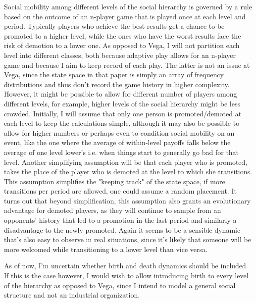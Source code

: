 \documentclass[11pt, a4paper, leqno]{article}
\begin{document}
Social mobility among different levels of the social hierarchy is governed by a rule based on the outcome of an n-player game that is played once at each level and period. Typically players who achieve the best results get a chance to be promoted to a higher level, while the ones who have the worst results face the risk of demotion to a lower one. As opposed to Vega, I will not partition each level into different classes, both because adaptive play allows for an n-player game and because I aim to keep record of each play. The latter is not an issue at Vega, since the state space in that paper is simply an array of frequency distributions and thus don't record the game history in higher complexity. However, it might be possible to allow for different number of players among different levels, for example, higher levels of the social hierarchy might be less crowded. Initially, I will assume that only one person is promoted/demoted at each level to keep the calculations simple, although it may also be possible to allow for higher numbers or perhaps even to condition social mobility on an event, like the one where the average of within-level payoffs falls below the average of one level lower's i.e. when things start to generally go bad for that level. Another simplifying assumption will be that each player who is promoted, takes the place of the player who is demoted at the level to which she transitions. This assumption simplifies the "keeping track" of the state space, if more transitions per period are allowed, one could assume a random placement. It turns out that beyond simplification, this assumption also grants an evolutionary advantage for demoted players, as they will continue to sample from an opponents' history that led to a promotion in the last period and similarly a disadvantage to the newly promoted. Again it seems to be a sensible dynamic that's also easy to observe in real situations, since it's likely that someone will be more welcomed while transitioning to a lower level than vice versa.

As of now, I'm uncertain whether birth and death dynamics should be included. If this is the case however, I would wish to allow introducing birth to every level of the hierarchy as opposed to Vega, since I intend to model a general social structure and not an industrial organization.
\end{document}
